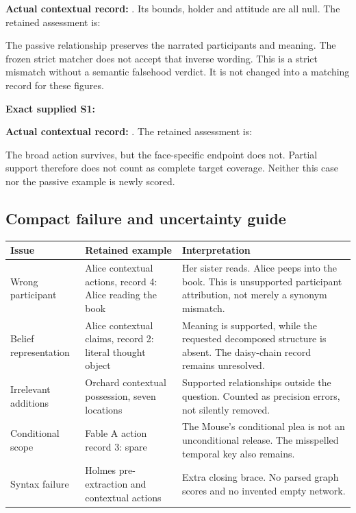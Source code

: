 \textbf{Actual contextual record:} \PassiveExample.
Its bounds, holder and attitude are all null. The retained assessment is:
\begin{quote}\PassiveExampleAssessment\end{quote}
The passive relationship preserves the narrated participants and meaning. The frozen strict matcher does not accept that inverse wording. This is a strict mismatch without a semantic falsehood verdict. It is not changed into a matching record for these figures.

\textbf{Exact supplied S1:} \FableOne

\textbf{Actual contextual record:} \PartialExample.
The retained assessment is:
\begin{quote}\PartialExampleAssessment\end{quote}
The broad action survives, but the face-specific endpoint does not. Partial support therefore does not count as complete target coverage. Neither this case nor the passive example is newly scored.

\subsection*{Compact failure and uncertainty guide}
\begin{tabular}{L{29mm}L{54mm}L{62mm}}
\toprule
Issue & Retained example & Interpretation\\\midrule
Wrong participant & Alice contextual actions, record 4: Alice reading the book & Her sister reads. Alice peeps into the book. This is unsupported participant attribution, not merely a synonym mismatch.\\
Belief representation & Alice contextual claims, record 2: literal thought object & Meaning is supported, while the requested decomposed structure is absent. The daisy-chain record remains unresolved.\\
Irrelevant additions & Orchard contextual possession, seven locations & Supported relationships outside the question. Counted as precision errors, not silently removed.\\
Conditional scope & Fable A action record 3: spare & The Mouse's conditional plea is not an unconditional release. The misspelled temporal key also remains.\\
Syntax failure & Holmes pre-extraction and contextual actions & Extra closing brace. No parsed graph scores and no invented empty network.\\
\bottomrule
\end{tabular}

